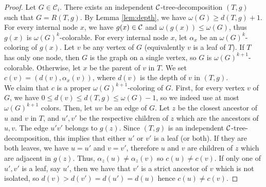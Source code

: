 \documentclass[11pt]{article}
\numberwithin{equation}{section}
\begin{document}
\begin{proof}
Let $G \in \mathcal{C}_i$. There exists an independent $\cal C$-tree-decomposition $(T, g)$ such that $G = R(T, g)$. By Lemma \ref{lem:depth}, we have $\omega(G) \geq d(T, g) + 1$. For every internal node $x$, we have $g(x) \in \cal C$ and $\omega(g(x)) \leq \omega(G)$, thus $g(x)$ is $\omega(G)^k$-colorable. For every internal node $x$, let $\alpha_x$ be an $\omega(G)^k$-coloring of $g(x)$. Let $v$ be any vertex of $G$ (equivalently $v$ is a leaf of $T$). If $T$ has only one node, then $G$ is the graph on a single vertex, so $G$ is $\omega(G)^{k+1}$-colorable. Otherwise, let $x$ be the parent of $v$ in $T$. We set $c(v) = (d(v), \alpha_x(v))$, where $d(v)$ is the depth of $v$ in $(T, g)$. \\
We claim that $c$ is a proper $\omega(G)^{k+1}$-coloring of $G$. First, for every vertex $v$ of $G$, we have $0 \leq d(v) \leq d(T, g) \leq \omega(G) - 1$, so we indeed use at most $\omega(G)^{k+1}$ colors. Then, let $uv$ be an edge of $G$. Let $z$ be the closest ancestor of $u$ and $v$ in $T$, and $u', v'$ be the respective children of $z$ which are the ancestors of $u, v$. The edge $u'v'$ belongs to  $g(z)$. Since $(T, g)$ is an independent $\cal C$-tree-decomposition, this implies that either $u'$ or $v'$ is a leaf (or both). If they are both leaves, we have $u = u'$ and $v = v'$, therefore $u$ and $v$ are children of $z$ which are adjacent in $g(z)$. Thus, $\alpha_z(u) \neq \alpha_z(v)$ so $c(u) \neq c(v)$. If only one of $u', v'$ is a leaf, say $u'$, then we have that $v'$ is a strict ancestor of $v$ which is not isolated, so $d(v) > d(v') = d(u') = d(u)$ hence $c(u) \neq c(v)$. 
\end{proof}
\end{document}
